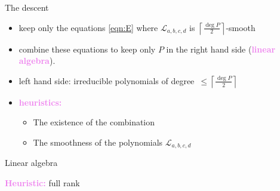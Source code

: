 \documentclass[xcolor=x11names,compress]{beamer}
\theoremstyle{break}
\theoremstyle{sc}
\theoremstyle{definition}
\theoremstyle{remark}
\begin{document}
\begin{frame}{The descent}
  \begin{itemize}
    \item keep only the equations \eqref{eqn:E} where $\mathcal L_{a, b, c, d}$ is
  $\left\lceil \frac{\deg P}{2}\right\rceil$-smooth
\item combine these equations to keep only $P$ in the right hand side
  (\textcolor{violet}{\textbf{linear algebra}}).
\item left hand side: irreducible polynomials 
  of degree~$\leq\left\lceil \frac{\deg P}{2}\right\rceil$
  \end{itemize}


  \begin{itemize}
    \item \textcolor{violet}{\textbf{heuristics:}}
      \begin{itemize}
        \item The existence of the combination
        \item The smoothness of the polynomials $\mathcal L_{a, b, c, d}$
      \end{itemize}
  \end{itemize}
\end{frame}

\begin{frame}{Linear algebra}
 

\textcolor{violet}{\textbf{Heuristic:}} full rank

\end{frame}
\end{document}
